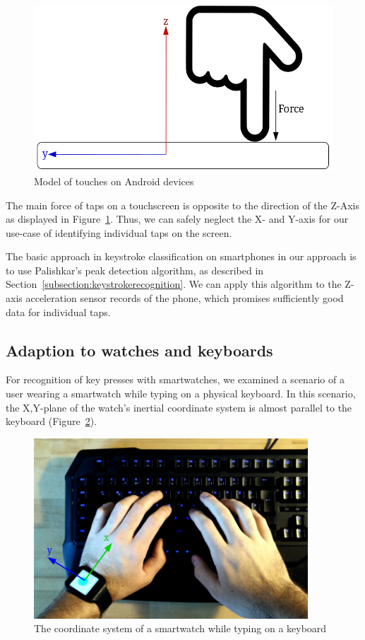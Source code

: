 \begin{figure}
    \centering
    \includegraphics[width=\textwidth]{figures/TapDirection.png}
    \caption{Model of touches on Android devices}
    \label{fig:touchdirection}
\end{figure}
The main force of taps on a touchscreen is opposite to the direction of the Z-Axis as displayed in Figure~\ref{fig:touchdirection}. Thus, we can safely neglect the X- and Y-axis for our use-case of identifying individual taps on the screen.

The basic approach in keystroke classification on smartphones in our approach is to use Palishkar's peak detection algorithm, as described in Section~\ref{subsection:keystrokerecognition}. We can apply this algorithm to the Z-axis acceleration sensor records of the phone, which promises sufficiently good data for individual taps.

\subsection{Adaption to watches and keyboards}
For recognition of key presses with smartwatches, we examined a scenario of a user wearing a smartwatch while typing on a physical keyboard. In this scenario, the X,Y-plane of the watch's inertial coordinate system is almost parallel to the keyboard (\cf Figure~\ref{fig:watchcoordinate}).

\begin{figure}
    \centering
    \includegraphics[width=0.9147\textwidth]{figures/WatchCoordinateSystem.png}
    \caption{The coordinate system of a smartwatch while typing on a keyboard}
    \label{fig:watchcoordinate}
\end{figure}

